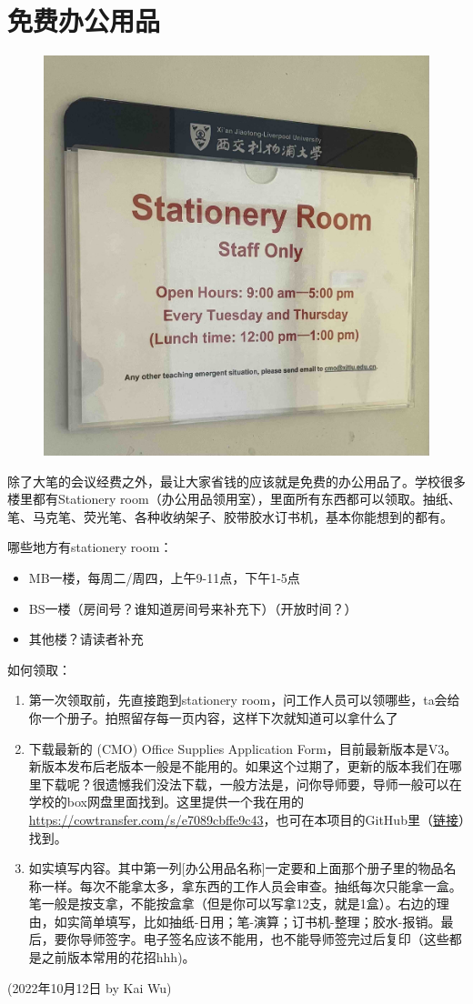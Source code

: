 \section{免费办公用品}
\begin{figure}[H]
    \centering
    \includegraphics[width=0.6\columnwidth]{author-folder/Kai.Wu/stationery_room.jpg}
\end{figure}

除了大笔的会议经费之外，最让大家省钱的应该就是免费的办公用品了。学校很多楼里都有Stationery room（办公用品领用室），里面所有东西都可以领取。抽纸、笔、马克笔、荧光笔、各种收纳架子、胶带胶水订书机，基本你能想到的都有。

\vspace{5mm}
哪些地方有stationery room：
\begin{itemize}
    \item MB一楼，每周二/周四，上午9-11点，下午1-5点
    \item BS一楼（房间号？谁知道房间号来补充下）（开放时间？）
    \item 其他楼？请读者补充
\end{itemize}

\vspace{5mm}
如何领取：
\begin{enumerate}
    \item 第一次领取前，先直接跑到stationery room，问工作人员可以领哪些，ta会给你一个册子。拍照留存每一页内容，这样下次就知道可以拿什么了
    \item 下载最新的 (CMO) Office Supplies Application Form，目前最新版本是V3。新版本发布后老版本一般是不能用的。如果这个过期了，更新的版本我们在哪里下载呢？很遗憾我们没法下载，一般方法是，问你导师要，导师一般可以在学校的box网盘里面找到。这里提供一个我在用的 \url{https://cowtransfer.com/s/e7089cbffe9c43}，也可在本项目的GitHub里（\href{https://github.com/kaiwu-astro/xp_pgrs_unofficial_guide/tree/main/fileshare}{链接}）找到。
    \item 如实填写内容。其中第一列[办公用品名称]一定要和上面那个册子里的物品名称一样。每次不能拿太多，拿东西的工作人员会审查。抽纸每次只能拿一盒。笔一般是按支拿，不能按盒拿（但是你可以写拿12支，就是1盒）。右边的理由，如实简单填写，比如抽纸-日用；笔-演算；订书机-整理；胶水-报销。最后，要你导师签字。电子签名应该不能用，也不能导师签完过后复印（这些都是之前版本常用的花招hhh)。
\end{enumerate}


\begin{flushright}
(2022年10月12日 by Kai Wu)
\end{flushright}